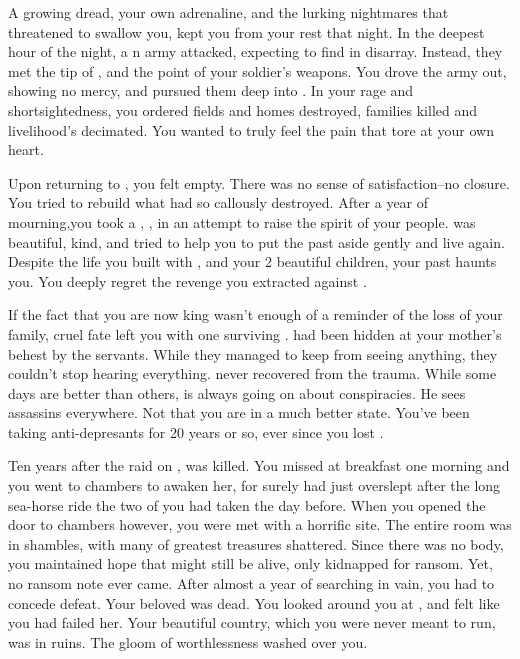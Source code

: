 \documentclass[char]{NeptuneBall}
\begin{document}
A growing dread, your own adrenaline, and the lurking nightmares that threatened to swallow you, kept you from your rest that night. In the deepest hour of the night, a \pPacifica{}n army attacked, expecting to find \pAtlantis{} in disarray. Instead, they met the tip of \iTrident{\MYname{}}, and the point of your soldier's weapons. You drove the army out, showing no mercy, and pursued them deep into \pPacifica{}. In your rage and shortsightedness, you ordered fields and homes destroyed, families killed and livelihood's decimated. You wanted \pPacifica{} to truly feel the pain that tore at your own heart.

Upon returning to \pAtlantis{}, you felt empty. There was no sense of satisfaction--no closure. You tried to rebuild what \pPacifica{} had so callously destroyed. After a year of mourning,you took a \cQueen{\spouse{}}, \cQueen{\King{}} \cQueen{}, in an attempt to raise the spirit of your people. \cQueen{\They{}} was beautiful, kind, and tried to help you to put the past aside gently and live again. Despite the life you built with \cQueen{}, and your 2 beautiful children, your past haunts you. You deeply regret the revenge you extracted against \pPacifica{}. 

If the fact that you are now king wasn't enough of a reminder of the loss of your family, cruel fate left you with one surviving \cPlant{\sibling}. \cPlant{} had been hidden at your mother's behest by the servants.  While they managed to keep \cPlant{\them} from seeing anything, they couldn't stop \cPlant{\them} hearing everything. \cPlant{} never recovered from the trauma.  While some days are better than others, \cPlant{} is always going on about conspiracies. He sees assassins everywhere.  Not that you are in a much better state. You've been taking anti-depresants for 20 years or so, ever since you lost \cQueen{}. 

Ten years after the raid on \pPacifica{}, \cQueen{} was killed. You missed \cQueen{\them} at breakfast one morning and you went to \cQueen{\them} chambers to awaken her, for surely \cQueen{\they} had just overslept after the long sea-horse ride the two of you had taken the day before. When you opened the door to \cQueen{\them} chambers however, you were met with a horrific site. The entire room was in shambles, with many of \cQueen{\them} greatest treasures shattered. Since there was no body, you maintained hope that \cQueen{\they} might still be alive, only kidnapped for ransom. Yet, no ransom note ever came. After almost a year of searching in vain, you had to concede defeat. Your beloved \cQueen{} was dead. You looked around you at \pAtlantis{}, and felt like you had failed her. Your beautiful country, which you were never meant to run, was in ruins. The gloom of worthlessness washed over you.
\end{document}
